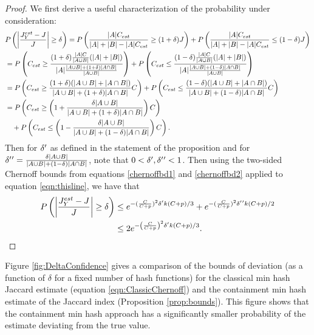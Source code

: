 \documentclass[11pt,reqno]{amsart}
\theoremstyle{remark}
\numberwithin{equation}{section}
\newcommand{\containX}{Y}
\begin{document}
\begin{proof}
We first derive a useful characterization of the probability under consideration:
\begin{align}
&P\left(\left|\frac{J_\containX^{est}-J}{J}\right|\geq \delta\right) %
= P\left(\frac{|A| C_{est}}{|A|+|B|-|A| C_{est}}\geq (1+\delta)J\right)+P\left(\frac{|A| C_{est}}{|A|+|B|-|A| C_{est}}\leq (1-\delta)J\right) \notag\\
&= P\left(C_{est}\geq\frac{ (1+\delta)\frac{|A|C}{|A\cup B|}(|A|+|B|)}{|A|\frac{|A\cup B|+(1+\delta)|A \cap B|}{|A\cup B|}} \right)+P\left(C_{est}\leq\frac{ (1-\delta)\frac{|A|C}{|A\cup B|}(|A|+|B|)}{|A|\frac{|A\cup B|+(1-\delta)|A \cap B|}{|A\cup B|}} \right)\notag\\
&= P\left(C_{est}\geq\frac{ (1+\delta)(|A \cup B|+|A \cap B|)}{|A\cup B|+(1+\delta)|A \cap B|} C \right)+P\left(C_{est}\leq\frac{ (1-\delta)(|A \cup B|+|A \cap B|)}{|A\cup B|+(1-\delta)|A \cap B|} C \right)\notag\\
&= P\left(C_{est}\geq\left(1+\frac{\delta |A \cup B|}{|A\cup B|+(1+\delta)|A \cap B|}\right) C \right)\notag\\
&\quad +P\left(C_{est}\leq\left(1-\frac{ \delta |A \cup B|}{|A\cup B|+(1-\delta)|A \cap B|}\right) C \right). \label{eqn:thisline}
\end{align}
Then for $\delta\rq{}$ as defined in the statement of the proposition and for $\delta\rq{}\rq{}=\frac{\delta |A \cup B|}{|A\cup B|+(1-\delta)|A \cap B|}$, note that $0<\delta\rq{}, \delta\rq{}\rq{}<1$. Then using the two-sided Chernoff bounds from equations \eqref{chernoffbd1} and \eqref{chernoffbd2} applied to equation \eqref{eqn:thisline}, we have that
\begin{align*}
P\left(\left|\frac{J_\containX^{est}-J}{J}\right|\geq \delta\right) &\leq e^{-(\frac{C}{C+p})^2\delta\rq{}k(C+p)/3}+e^{-(\frac{C}{C+p})^2\delta\rq{}\rq{}k(C+p)/2}\\
&\leq 2e^{-\left(\frac{C}{C+p}\right)^2\delta\rq{}k(C+p)/3}.
\end{align*}
\end{proof}
 Figure \ref{fig:DeltaConfidence} gives a comparison of the bounds of deviation (as a function of $\delta$ for a fixed number of hash functions) for the classical min hash Jaccard estimate (equation \eqref{eqn:ClassicChernoff}) and the containment min hash estimate of the Jaccard index (Proposition \ref{prop:bounds}). This figure shows that the containment min hash approach has a significantly smaller probability of the estimate deviating from the true value. 
\end{document}
